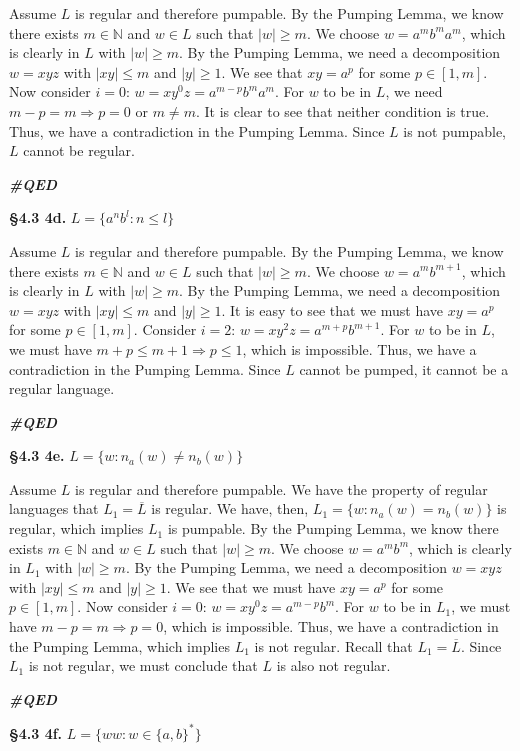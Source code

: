 \documentclass[12pt,letter]{article}
\newcommand{\QED}{
	\begin{flushright}
		\textit{\textbf{\#QED}}
	\end{flushright}
}
\begin{document}
Assume $L$ is regular and therefore pumpable. By the Pumping Lemma, we know there exists $m \in \mathbb{N}$ and $w \in L$ such that $|w| \geq m$. We choose $w = a^m b^m a^m$, which is clearly in $L$ with $|w| \geq m$. By the Pumping Lemma, we need a decomposition $w = xyz$ with $|xy| \leq m$ and $|y| \geq 1$. We see that $xy = a^p$ for some $p \in [1, m]$. Now consider $i = 0$: $w = xy^0 z = a^{m - p} b^m a^m$. For $w$ to be in $L$, we need $m - p = m \Rightarrow p = 0$ or $m \neq m$. It is clear to see that neither condition is true. Thus, we have a contradiction in the Pumping Lemma. Since $L$ is not pumpable, $L$ cannot be regular. \QED

\pagebreak

\textbf{\S 4.3 4d.} $L = \{ a^n b^l : n \leq l \}$

Assume $L$ is regular and therefore pumpable. By the Pumping Lemma, we know there exists $m \in \mathbb{N}$ and $w \in L$ such that $|w| \geq m$. We choose $w = a^m b^{m+1}$, which is clearly in $L$ with $|w| \geq m$. By the Pumping Lemma, we need a decomposition $w = xyz$ with $|xy| \leq m$ and $|y| \geq 1$. It is easy to see that we must have $xy = a^p$ for some $p \in [1, m]$. Consider $i = 2$: $w = xy^2 z = a^{m+p} b^{m+1}$. For $w$ to be in $L$, we must have $m + p \leq m + 1 \Rightarrow p \leq 1$, which is impossible. Thus, we have a contradiction in the Pumping Lemma. Since $L$ cannot be pumped, it cannot be a regular language. \QED


\textbf{\S 4.3 4e.} $L = \{ w : n_a (w) \neq n_b (w) \}$

Assume $L$ is regular and therefore pumpable. We have the property of regular languages that $L_1 = \overline{L}$ is regular. We have, then, $L_1 = \{ w : n_a (w) = n_b (w) \}$ is regular, which implies $L_1$ is pumpable. By the Pumping Lemma, we know there exists $m \in \mathbb{N}$ and $w \in L$ such that $|w| \geq m$. We choose $w = a^m b^m$, which is clearly in $L_1$ with $|w| \geq m$. By the Pumping Lemma, we need a decomposition $w = xyz$ with $|xy| \leq m$ and $|y| \geq 1$. We see that we must have $xy = a^p$ for some $p \in [1, m]$. Now consider $i = 0$: $w = xy^0 z = a^{m-p} b^m$. For $w$ to be in $L_1$, we must have $m - p = m \Rightarrow p = 0$, which is impossible. Thus, we have a contradiction in the Pumping Lemma, which implies $L_1$ is not regular. Recall that $L_1 = \overline{L}$. Since $L_1$ is not regular, we must conclude that $L$ is also not regular. \QED

\textbf{\S 4.3 4f.} $L = \{ ww : w \in \{ a,b \}^* \}$
\end{document}
